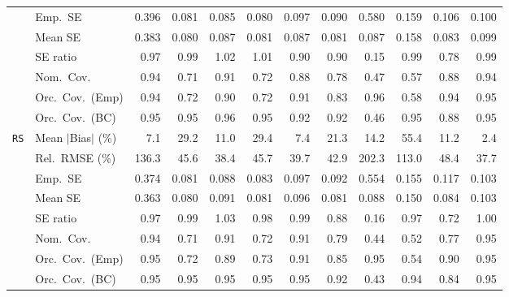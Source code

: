 \begin{landscape}
\begin{longtable}{llrrrrrrrrrr}
 & Emp.\ SE & 0.396 & 0.081 & 0.085 & 0.080 & 0.097 & 0.090 & 0.580 & 0.159 & 0.106 & 0.100 \\
 & Mean SE & 0.383 & 0.080 & 0.087 & 0.081 & 0.087 & 0.081 & 0.087 & 0.158 & 0.083 & 0.099 \\
 & SE ratio & \cellcolor{rankthree}0.97 & \cellcolor{rankone}0.99 & \cellcolor{ranktwo}1.02 & \cellcolor{rankone}1.01 & 0.90 & 0.90 & 0.15 & \cellcolor{rankone}0.99 & 0.78 & \cellcolor{rankone}0.99 \\
 & Nom.\ Cov. & \cellcolor{rankone}0.94 & 0.71 & \cellcolor{ranktwo}0.91 & 0.72 & \cellcolor{rankthree}0.88 & 0.78 & 0.47 & 0.57 & \cellcolor{rankthree}0.88 & \cellcolor{rankone}0.94 \\
 & Orc.\ Cov.\ (Emp) & \cellcolor{ranktwo}0.94 & 0.72 & 0.90 & 0.72 & \cellcolor{rankthree}0.91 & 0.83 & \cellcolor{ranktwo}0.96 & 0.58 & \cellcolor{ranktwo}0.94 & \cellcolor{rankone}0.95 \\
 & Orc.\ Cov.\ (BC) & \cellcolor{rankone}0.95 & \cellcolor{rankone}0.95 & \cellcolor{ranktwo}0.96 & \cellcolor{rankone}0.95 & \cellcolor{rankthree}0.92 & \cellcolor{rankthree}0.92 & 0.46 & \cellcolor{rankone}0.95 & 0.88 & \cellcolor{rankone}0.95 \\
\addlinespace[2pt]
\quad \texttt{RS} & Mean $|$Bias$|$ (\%) & \cellcolor{ranktwo}7.1 & 29.2 & 11.0 & 29.4 & \cellcolor{rankthree}7.4 & 21.3 & 14.2 & 55.4 & 11.2 & \cellcolor{rankone}2.4 \\
 & Rel.\ RMSE (\%) & 136.3 & 45.6 & \cellcolor{ranktwo}38.4 & 45.7 & \cellcolor{rankthree}39.7 & 42.9 & 202.3 & 113.0 & 48.4 & \cellcolor{rankone}37.7 \\
 & Emp.\ SE & 0.374 & 0.081 & 0.088 & 0.083 & 0.097 & 0.092 & 0.554 & 0.155 & 0.117 & 0.103 \\
 & Mean SE & 0.363 & 0.080 & 0.091 & 0.081 & 0.096 & 0.081 & 0.088 & 0.150 & 0.084 & 0.103 \\
 & SE ratio & 0.97 & \cellcolor{ranktwo}0.99 & 1.03 & \cellcolor{rankthree}0.98 & \cellcolor{ranktwo}0.99 & 0.88 & 0.16 & 0.97 & 0.72 & \cellcolor{rankone}1.00 \\
 & Nom.\ Cov. & \cellcolor{ranktwo}0.94 & 0.71 & \cellcolor{rankthree}0.91 & 0.72 & \cellcolor{rankthree}0.91 & 0.79 & 0.44 & 0.52 & 0.77 & \cellcolor{rankone}0.95 \\
 & Orc.\ Cov.\ (Emp) & \cellcolor{rankone}0.95 & 0.72 & 0.89 & 0.73 & \cellcolor{ranktwo}0.91 & 0.85 & \cellcolor{rankone}0.95 & 0.54 & \cellcolor{rankthree}0.90 & \cellcolor{rankone}0.95 \\
 & Orc.\ Cov.\ (BC) & \cellcolor{rankone}0.95 & \cellcolor{rankone}0.95 & \cellcolor{rankone}0.95 & \cellcolor{rankone}0.95 & \cellcolor{rankone}0.95 & \cellcolor{rankthree}0.92 & 0.43 & \cellcolor{ranktwo}0.94 & 0.84 & \cellcolor{rankone}0.95 \\

\end{longtable}
\end{landscape}
